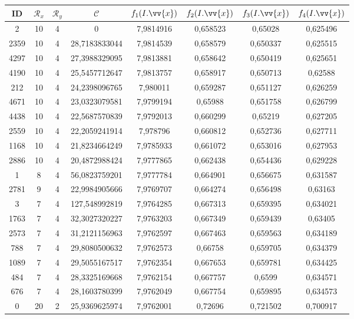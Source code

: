\scriptsize
\begin{longtable}{|c|c|c|c|c|c|c|c|}
\hline
ID & $\mathscr{R}_x$ & $\mathscr{R}_y$ & $\mathscr{C}$ & $f_1(I.\vv{x})$ & $f_2(I.\vv{x})$ & $f_3(I.\vv{x})$ & $f_4(I.\vv{x})$ \\
\hline
2 & 10 & 4 & 0 & 7,9814916 & 0,658523 & 0,65028 & 0,625496 \\
2359 & 10 & 4 & 28,7183833044 & 7,9814539 & 0,658579 & 0,650337 & 0,625515 \\
4297 & 10 & 4 & 27,3988329095 & 7,9813881 & 0,658642 & 0,650419 & 0,625651 \\
4190 & 10 & 4 & 25,5457712647 & 7,9813757 & 0,658917 & 0,650713 & 0,62588 \\
212 & 10 & 4 & 24,2398096765 & 7,980011 & 0,659287 & 0,651127 & 0,626259 \\
4671 & 10 & 4 & 23,0323079581 & 7,9799194 & 0,65988 & 0,651758 & 0,626799 \\
4438 & 10 & 4 & 22,5687570839 & 7,9792013 & 0,660299 & 0,65219 & 0,627205 \\
2559 & 10 & 4 & 22,2059241914 & 7,978796 & 0,660812 & 0,652736 & 0,627711 \\
1168 & 10 & 4 & 21,8234664249 & 7,9785933 & 0,661072 & 0,653016 & 0,627953 \\
2886 & 10 & 4 & 20,4872988424 & 7,9777865 & 0,662438 & 0,654436 & 0,629228 \\
1 & 8 & 4 & 56,0823759201 & 7,9777784 & 0,664901 & 0,656675 & 0,631587 \\
2781 & 9 & 4 & 22,9984905666 & 7,9769707 & 0,664274 & 0,656498 & 0,63163 \\
3 & 7 & 4 & 127,548992819 & 7,9764285 & 0,667313 & 0,659395 & 0,634021 \\
1763 & 7 & 4 & 32,3027320227 & 7,9763203 & 0,667349 & 0,659439 & 0,63405 \\
2573 & 7 & 4 & 31,2121156963 & 7,9762597 & 0,667463 & 0,659563 & 0,634189 \\
788 & 7 & 4 & 29,8080500632 & 7,9762573 & 0,66758 & 0,659705 & 0,634379 \\
1089 & 7 & 4 & 29,5055167517 & 7,9762354 & 0,667653 & 0,659781 & 0,634425 \\
484 & 7 & 4 & 28,3325169668 & 7,9762154 & 0,667757 & 0,6599 & 0,634571 \\
676 & 7 & 4 & 28,1603780399 & 7,9762049 & 0,667754 & 0,659895 & 0,634573 \\
0 & 20 & 2 & 25,9369625974 & 7,9762001 & 0,72696 & 0,721502 & 0,700917 \\

\end{longtable}
